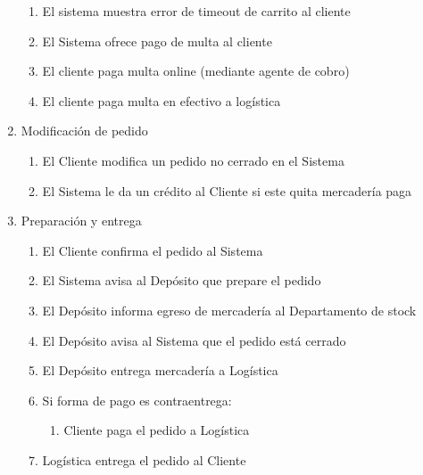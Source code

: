\begin{enumerate}
\begin{enumerate}
    \item El sistema muestra error de timeout de carrito al cliente \label{itm:f-sistema-error-timeout-cliente}
    \item El Sistema ofrece pago de multa al cliente \label{itm:f-sistema-ofrece-multa-cliente}
    \item El cliente paga multa online (mediante agente de cobro) \label{itm:f-cliente-paga-multa-agentecobro}
    \item El cliente paga multa en efectivo a logística \label{itm:f-cliente-paga-multa-logistica}
  \end{enumerate}

\item Modificación de pedido
  \begin{enumerate}
    \item El Cliente modifica un pedido no cerrado en el Sistema \label{itm:f-cliente-modifica-pedido-sistema}
    \item El Sistema le da un crédito al Cliente si este quita mercadería paga \label{itm:f-sistema-da-credito-cliente}
  \end{enumerate}

\item Preparación y entrega
  \begin{enumerate}
    \item El Cliente confirma el pedido al Sistema \label{itm:f-cliente-confirma-pedido-sistema}
    \item El Sistema avisa al Depósito que prepare el pedido \label{itm:f-sistema-avisa-pedido-deposito}
    \item El Depósito informa egreso de mercadería al Departamento de stock \label{itm:f-sistema-egresa-mercaderia-dptostock}
    \item El Depósito avisa al Sistema que el pedido está cerrado \label{itm:f-deposito-cerro-pedido-sistema}
    \item El Depósito entrega mercadería a Logística \label{itm:f-deposito-entrega-mercaderia-logistica}
    \item Si forma de pago es contraentrega:
    \begin{enumerate}
      \item Cliente paga el pedido a Logística \label{itm:f-cliente-paga-logistica}
    \end{enumerate}
    \item Logística entrega el pedido al Cliente \label{itm:f-logistica-entrega-cliente}
  \end{enumerate}


\end{enumerate}
